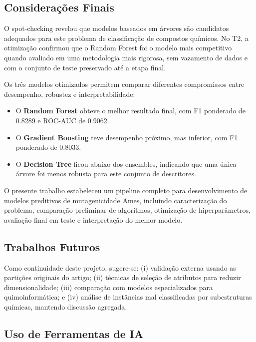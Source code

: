 \documentclass[12pt,a4paper]{article}
\begin{document}
\subsection{Considerações Finais}

O spot-checking revelou que modelos baseados em árvores são candidatos adequados para este problema de classificação de compostos químicos. No T2, a otimização confirmou que o Random Forest foi o modelo mais competitivo quando avaliado em uma metodologia mais rigorosa, sem vazamento de dados e com o conjunto de teste preservado até a etapa final.

Os três modelos otimizados permitem comparar diferentes compromissos entre desempenho, robustez e interpretabilidade:

\begin{itemize}
    \item O \textbf{Random Forest} obteve o melhor resultado final, com F1 ponderado de 0.8289 e ROC-AUC de 0.9062.
    \item O \textbf{Gradient Boosting} teve desempenho próximo, mas inferior, com F1 ponderado de 0.8033.
    \item O \textbf{Decision Tree} ficou abaixo dos ensembles, indicando que uma única árvore foi menos robusta para este conjunto de descritores.
\end{itemize}

O presente trabalho estabeleceu um pipeline completo para desenvolvimento de modelos preditivos de mutagenicidade Ames, incluindo caracterização do problema, comparação preliminar de algoritmos, otimização de hiperparâmetros, avaliação final em teste e interpretação do melhor modelo.

\subsection{Trabalhos Futuros}

Como continuidade deste projeto, sugere-se: (i) validação externa usando as partições originais do artigo; (ii) técnicas de seleção de atributos para reduzir dimensionalidade; (iii) comparação com modelos especializados para quimoinformática; e (iv) análise de instâncias mal classificadas por subestruturas químicas, mantendo discussão agregada.

\subsection{Uso de Ferramentas de IA}
\end{document}
